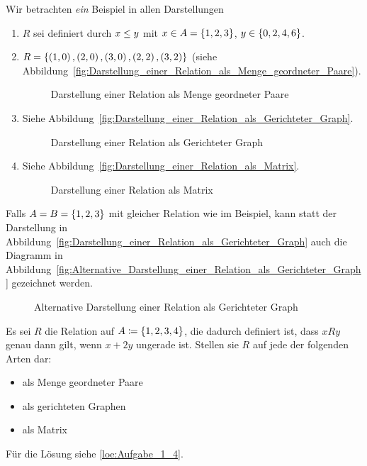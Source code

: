\begin{example}
Wir betrachten \emph{ein} Beispiel in allen Darstellungen
\begin{enumerate}
\item $R$ sei definiert durch $x \leq y$ mit $x \in A = \left\{1, 2, 3\right\}$, $y \in \left\{0, 2, 4, 6\right\}$.
\item $R = \left\{\left(1,0\right), \left(2,0\right), \left(3,0\right), \left(2,2\right), \left(3,2\right)\right\}$ (siehe Abbildung~\vref{fig:Darstellung_einer_Relation_als_Menge_geordneter_Paare}).
	\begin{figure}[htb]
	\centering
	
	\caption{Darstellung einer Relation als Menge geordneter Paare}
	\label{fig:Darstellung_einer_Relation_als_Menge_geordneter_Paare}
	\end{figure}

\item Siehe Abbildung~\vref{fig:Darstellung_einer_Relation_als_Gerichteter_Graph}.
	\begin{figure}[htb]
	\centering
	
	\caption{Darstellung einer Relation als Gerichteter Graph}
	\label{fig:Darstellung_einer_Relation_als_Gerichteter_Graph}
	\end{figure}

\item Siehe Abbildung~\vref{fig:Darstellung_einer_Relation_als_Matrix}.
	\begin{figure}[htb]
	\centering
	
	\caption{Darstellung einer Relation als Matrix}
	\label{fig:Darstellung_einer_Relation_als_Matrix}
	\end{figure}
\end{enumerate}
\end{example}

\begin{note}
Falls $A = B = \left\{1, 2, 3\right\}$ mit gleicher Relation wie im Beispiel, kann statt der Darstellung in Abbildung~\vref{fig:Darstellung_einer_Relation_als_Gerichteter_Graph} auch die Diagramm in Abbildung~\vref{fig:Alternative_Darstellung_einer_Relation_als_Gerichteter_Graph} gezeichnet werden.
\begin{figure}[htb]
\centering

\caption{Alternative Darstellung einer Relation als Gerichteter Graph}
\label{fig:Alternative_Darstellung_einer_Relation_als_Gerichteter_Graph}
\end{figure}
\end{note}

\begin{exercise}
Es sei $R$ die Relation auf $A \mathrel{\mathop:\!\!=} \left\{1, 2, 3, 4\right\}$, die dadurch definiert ist, dass $xRy$ genau dann gilt, wenn $x + 2y$ ungerade ist. Stellen sie $R$ auf jede der folgenden Arten dar:
\begin{itemize}
\item als Menge geordneter Paare
\item als gerichteten Graphen
\item als Matrix
\end{itemize}
Für die Lösung siehe \vref{loe:Aufgabe_1_4}.
\label{exc:Aufgabe_1_4}
\end{exercise}
